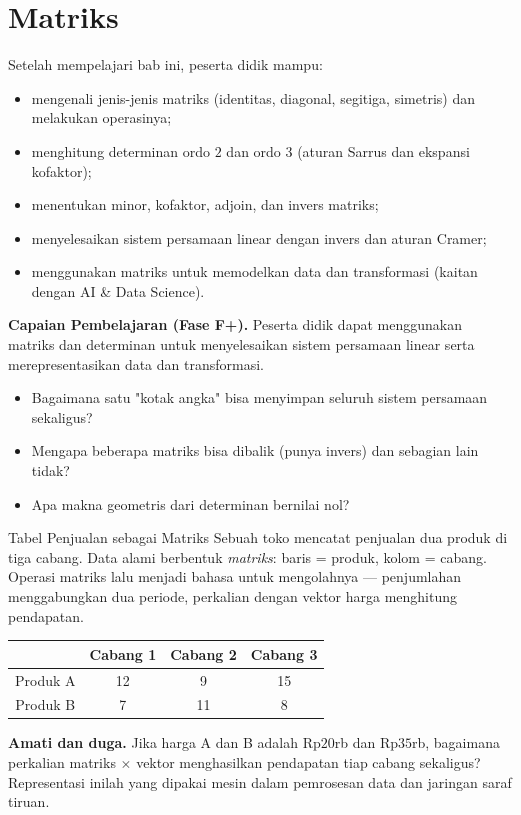 \documentclass[11pt,a4paper]{report}
\theoremstyle{gaya}
\begin{document}
\chapter{Matriks}
\begin{tujuan}
Setelah mempelajari bab ini, peserta didik mampu:
\begin{itemize}[leftmargin=*,topsep=2pt]
  \item mengenali jenis-jenis matriks (identitas, diagonal, segitiga, simetris) dan melakukan operasinya;
  \item menghitung determinan ordo $2$ dan ordo $3$ (aturan Sarrus dan ekspansi kofaktor);
  \item menentukan minor, kofaktor, adjoin, dan invers matriks;
  \item menyelesaikan sistem persamaan linear dengan invers dan aturan Cramer;
  \item menggunakan matriks untuk memodelkan data dan transformasi (kaitan dengan AI \& Data Science).
\end{itemize}
\textbf{Capaian Pembelajaran (Fase F+).} Peserta didik dapat menggunakan matriks dan determinan untuk menyelesaikan sistem persamaan linear serta merepresentasikan data dan transformasi.
\end{tujuan}

\begin{pemantik}
\begin{itemize}[leftmargin=*,topsep=2pt]
  \item Bagaimana satu "kotak angka" bisa menyimpan seluruh sistem persamaan sekaligus?
  \item Mengapa beberapa matriks bisa dibalik (punya invers) dan sebagian lain tidak?
  \item Apa makna geometris dari determinan bernilai nol?
\end{itemize}
\end{pemantik}

\begin{studikasus}{Tabel Penjualan sebagai Matriks}
Sebuah toko mencatat penjualan dua produk di tiga cabang. Data alami berbentuk \emph{matriks}: baris = produk, kolom = cabang. Operasi matriks lalu menjadi bahasa untuk mengolahnya --- penjumlahan menggabungkan dua periode, perkalian dengan vektor harga menghitung pendapatan.
\begin{center}
\begin{tabular}{c|ccc}
\toprule
& Cabang 1 & Cabang 2 & Cabang 3 \\
\midrule
Produk A & 12 & 9 & 15 \\
Produk B & 7 & 11 & 8 \\
\bottomrule
\end{tabular}
\end{center}
\textbf{Amati dan duga.} Jika harga A dan B adalah Rp$20$rb dan Rp$35$rb, bagaimana perkalian matriks $\times$ vektor menghasilkan pendapatan tiap cabang sekaligus? Representasi inilah yang dipakai mesin dalam pemrosesan data dan jaringan saraf tiruan.
\end{studikasus}
\end{document}

